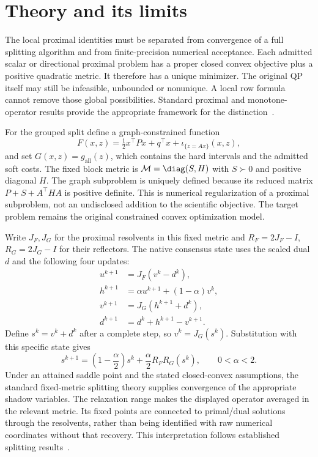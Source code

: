 \section{Theory and its limits}\label{sec:theory}
The local proximal identities must be separated from convergence of a full
splitting algorithm and from finite-precision numerical acceptance. Each
admitted scalar or directional proximal problem has a proper closed convex
objective plus a positive quadratic metric. It therefore has a unique
minimizer. The original QP itself may still be infeasible, unbounded or
nonunique. A local row formula cannot remove those global possibilities.
Standard proximal and monotone-operator results provide the appropriate
framework for the distinction~\cite{prox,rockafellarppa,lions,eckstein}.

For the grouped split define a graph-constrained function
\begin{equation}\label{eq:paper-graph-function}
 F(x,z)=\tfrac12x^\top P x+q^\top x+
            \iota_{\{z=Ax\}}(x,z),
\end{equation}
and set $G(x,z)=g_{\mathrm{all}}(z)$, which contains the hard intervals
and the admitted soft costs.
The fixed block metric is $\mathcal M=\diag(S,H)$ with $S\succ0$ and
positive diagonal $H$. The graph subproblem is uniquely defined because
its reduced matrix $P+S+A^\top H A$ is positive definite. This is
numerical regularization of a proximal subproblem, not an undisclosed
addition to the scientific objective. The target problem remains the
original constrained convex optimization model.

Write $J_F,J_G$ for the proximal resolvents in this fixed metric and
$R_F=2J_F-I$, $R_G=2J_G-I$ for their reflectors. The native consensus
state uses the scaled dual $d$ and the following four updates:
\begin{align}\label{eq:paper-consensus-updates}
 u^{k+1}&=J_F(v^k-d^k),\\
 h^{k+1}&=\alpha u^{k+1}+(1-\alpha)v^k,\nonumber\\
 v^{k+1}&=J_G(h^{k+1}+d^k),\nonumber\\
 d^{k+1}&=d^k+h^{k+1}-v^{k+1}.\nonumber
\end{align}
Define $s^k=v^k+d^k$ after a complete step, so $v^k=J_G(s^k)$.
Substitution with this specific state gives
\begin{equation}\label{eq:paper-relaxed-dr}
 s^{k+1}=\left(1-\frac\alpha2\right)s^k+
                    \frac\alpha2 R_F R_G(s^k),\qquad0<\alpha<2.
\end{equation}
Under an attained saddle point and the stated closed-convex assumptions,
the standard fixed-metric splitting theory supplies convergence of the
appropriate shadow variables. The relaxation range makes the displayed
operator averaged in the relevant metric. Its fixed points are connected
to primal/dual solutions through the resolvents, rather than being
identified with raw numerical coordinates without that recovery.
This interpretation follows established splitting results~\cite{admm,eckstein}.

